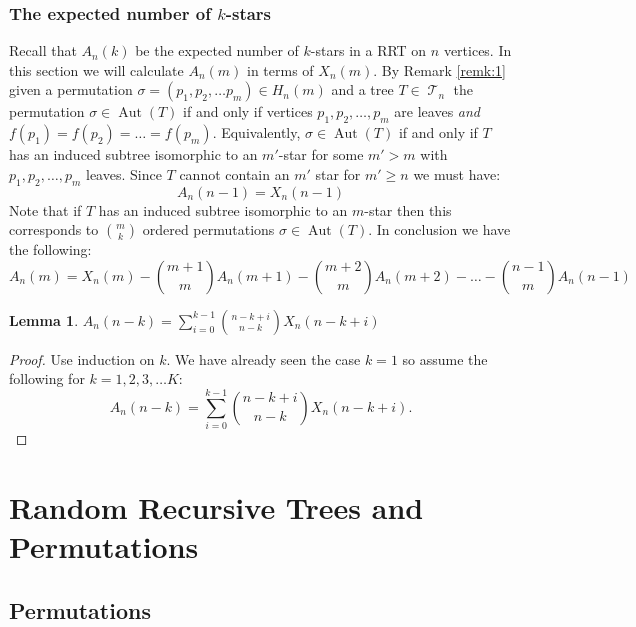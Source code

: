 \documentclass[oneside]{book} %
\newtheorem{lem}[thm]{Lemma}
\theoremstyle{definition}
\numberwithin{equation}{section}
\DeclareMathOperator{\Aut}{Aut} %
\DeclareMathOperator{\T}{\mathcal{T}}
\begin{document}
\subsection{The expected number of $k$-stars}
Recall that $A_n(k)$ be the expected number of $k$-stars in a RRT on $n$ vertices. In this section we will calculate $A_n(m)$  in terms of $X_n(m)$.  By Remark \ref{remk:1} given a permutation $\sigma  = (p_1,p_2,\dots p_m) \in H_n(m)$ and a tree $T \in \T_n$ the permutation $\sigma \in \Aut(T)$ if and only if vertices $p_1,p_2,\dots,p_m$ are leaves \emph {and} $f(p_1) = f(p_2) = \dots = f(p_m)$.  Equivalently,  $\sigma \in \Aut(T)$ if and only if $T$ has an induced subtree isomorphic to an $m'$-star for some $m'>m$ with $p_1,p_2,\dots,p_m$ leaves.  Since $T$ cannot contain an $m'$ star for $m' \geq n$ we must have:
\[
 A_n(n-1) = X_n(n-1)
\]
Note that if $T$ has an induced subtree isomorphic to an $m$-star then this corresponds to ${m\choose k}$ ordered permutations $\sigma \in \Aut(T)$.  In conclusion we have the following:
\begin{equation}
 A_n(m) = X_n(m) - {m+1\choose m}A_n(m+1) - {m+2\choose m}A_n(m+2) - \dots - {n-1\choose m} A_n(n-1)
\end{equation}



\begin{lem}
 $A_n(n-k) = \sum_{i=0}^{k-1}{n-k+i\choose n-k} X_n(n-k+i)$
\end{lem}
\begin{proof}
Use induction on $k$.  We have already seen the case $k = 1$ so assume the following for $k = 1,2,3,\dots K$:
\begin{equation}\label{eqn:indhyp}
  A_n(n-k) = \sum_{i=0}^{k-1}{n-k+i\choose n-k} X_n(n-k+i).
\end{equation}

\end{proof}








\chapter{Random Recursive Trees and Permutations}\label{chap:perms}

\section{Permutations}
\end{document}
